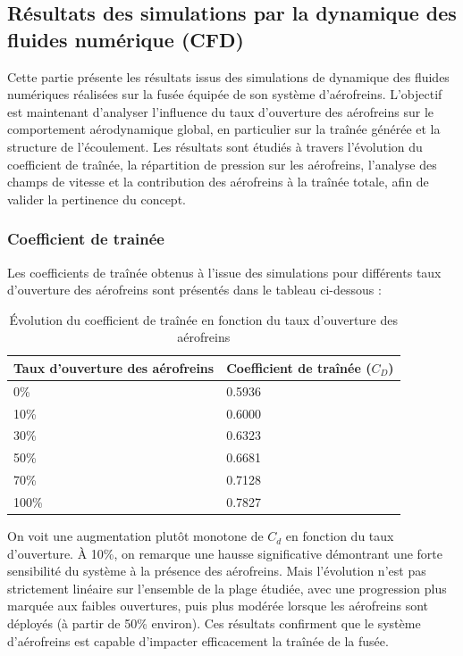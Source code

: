 \subsection{Résultats des simulations par la dynamique des fluides numérique (\acrshort{CFD})}

Cette partie présente les résultats issus des simulations de dynamique des fluides numériques réalisées sur la fusée équipée de
son système d’aérofreins. L’objectif est maintenant d’analyser l’influence du taux d’ouverture des aérofreins sur le
comportement aérodynamique global, en particulier sur la traînée générée et la structure de l’écoulement. Les résultats sont
étudiés à travers l’évolution du coefficient de traînée, la répartition de pression sur les aérofreins, l’analyse des champs de
vitesse et la contribution des aérofreins à la traînée totale, afin de valider la pertinence du concept.

\subsubsection{Coefficient de trainée}

Les coefficients de traînée obtenus à l’issue des simulations pour différents taux d’ouverture des aérofreins sont présentés
dans le tableau ci-dessous :

\begin{table}[H]
    \centering
    \begin{tabular}{|l|l|}
        \hline
        \textbf{Taux d'ouverture des aérofreins} & \textbf{Coefficient de traînée ($C_D$)} \\
        \hline
        \hline
        0\%  & 0.5936 \\
        \hline
        10\% & 0.6000 \\
        \hline
        30\% & 0.6323 \\
        \hline
        50\% & 0.6681 \\
        \hline
        70\% & 0.7128 \\
        \hline
        100\% & 0.7827 \\
        \hline
    \end{tabular}
    \caption{Évolution du coefficient de traînée en fonction du taux d'ouverture des aérofreins}
    \label{tab:Cd_vs_Aerofreins}
\end{table}

On voit une augmentation plutôt monotone de $C_d$ en fonction du taux d’ouverture. À 10\%, on remarque une hausse significative
démontrant une forte sensibilité du système à la présence des aérofreins. Mais l’évolution n’est pas strictement linéaire sur
l’ensemble de la plage étudiée, avec une progression plus marquée aux faibles ouvertures, puis plus modérée lorsque les
aérofreins sont déployés (à partir de 50\% environ). Ces résultats confirment que le système d’aérofreins est capable d’impacter
efficacement la traînée de la fusée. \\

